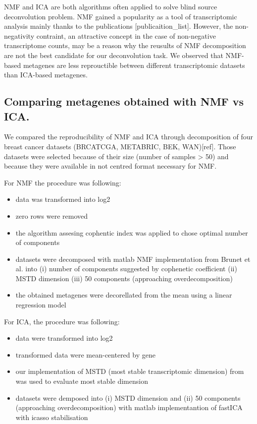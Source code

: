 \documentclass[12pt,]{book}
\providecommand{\tightlist}{%
  \setlength{\itemsep}{0pt}\setlength{\parskip}{0pt}}
\theoremstyle{definition}
\theoremstyle{definition}
\theoremstyle{definition}
\theoremstyle{remark}
\begin{document}
NMF and ICA are both algorithms often applied to solve blind source
deconvolution problem. NMF gained a popularity as a tool of
transcriptomic analysis mainly thanks to the publications
{[}publicaition\_list{]}. However, the non-negativity contraint, an
attractive concept in the case of non-negative transcriptome counts, may
be a reason why the reusults of NMF decomposition are not the best
candidate for our deconvolution task. We observed that NMF-based
metagenes are less reprouctible between different transcriptomic
datasets than ICA-based metagenes.

\hypertarget{comparing-metagenes-obtained-with-nmf-vs-ica.}{%
\subsection{Comparing metagenes obtained with NMF vs
ICA.}\label{comparing-metagenes-obtained-with-nmf-vs-ica.}}

We compared the reproducibility of NMF and ICA through decomposition of
four breast cancer datasets (BRCATCGA, METABRIC, BEK, WAN){[}ref{]}.
Those datasets were selected because of their size (number of samples
\textgreater{} 50) and because they were available in not centred format
necessary for NMF.

For NMF the procedure was following:

\begin{itemize}
\tightlist
\item
  data was transformed into log2
\item
  zero rows were removed
\item
  the algorithm assesing cophentic index was applied to chose optimal
  number of components
\item
  datasets were decomposed with matlab NMF implementation from Brunet et
  al. \citep{Brunet} into (i) number of components suggested by
  cophenetic coefficient (ii) MSTD dimension (iii) 50 components
  (approaching overdecomposition)
\item
  the obtained metagenes were decorellated from the mean using a linear
  regression model
\end{itemize}

For ICA, the procedure was following:

\begin{itemize}
\tightlist
\item
  data were transformed into log2
\item
  transformed data were mean-centered by gene
\item
  our implementation of MSTD (most stable transcriptomic dimension) from
  \citep{Ulykbek2017} was used to evaluate most stable dimension
\item
  datasets were demposed into (i) MSTD dimension and (ii) 50 components
  (approaching overdecomposition) with matlab implementantion of fastICA
  with icasso stabilisation
\end{itemize}
\end{document}
